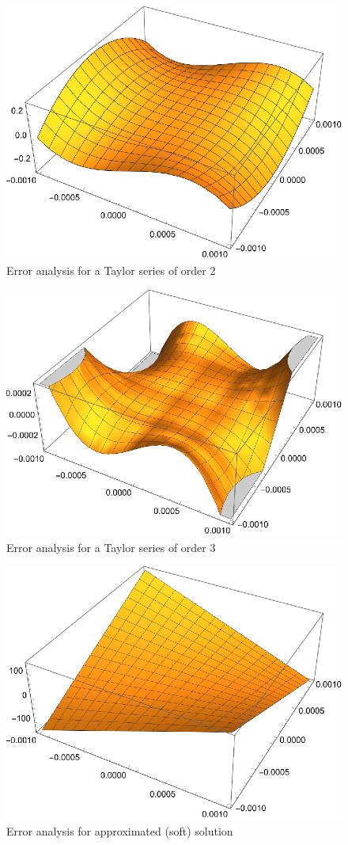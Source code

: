 \begin{figure}[H]
    \centering
    \includegraphics[width=.5\textwidth]{./pdf/error_taylor_order_2}
    \caption{Error analysis for a Taylor series of order 2}
    \label{fig:error_taylor_order_2}
\end{figure}

\begin{figure}[H]
    \centering
    \includegraphics[width=.5\textwidth]{./pdf/error_taylor_order_3}
    \caption{Error analysis for a Taylor series of order 3}
    \label{fig:error_taylor_order_3}
\end{figure}


\begin{figure}[H]
    \centering
    \includegraphics[width=.5\textwidth]{./pdf/error_approximated_soft}
    \caption{Error analysis for approximated (soft) solution}
    \label{fig:error_approximated_soft}
\end{figure}

